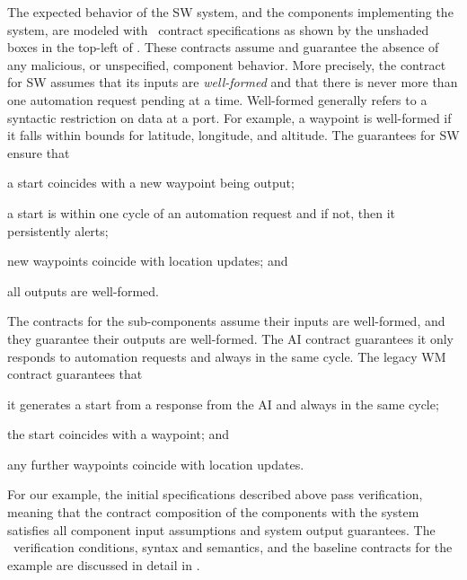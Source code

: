 
The expected behavior of the SW system, and the components
implementing the system, are modeled with \agr\ contract
specifications as shown by the unshaded boxes in the top-left of .
These contracts assume and guarantee the absence
of any malicious, or unspecified, component behavior.  More precisely,
the contract for SW assumes that its inputs are \emph{well-formed} and that
there is never more than one automation request pending at a time.
Well-formed generally refers to a syntactic restriction on
data at a port. For example, a waypoint is well-formed if it falls
within bounds for latitude, longitude, and altitude.  The guarantees
for SW ensure that
\begin{compactitem}
\item a start coincides with a new waypoint being output;
\item a start is within one cycle of an automation request and if not, then it persistently alerts;
\item new waypoints coincide with location updates; and
\item all outputs are well-formed.
\end{compactitem}

The contracts for the sub-components assume their inputs are
well-formed, and they guarantee their outputs are well-formed.  The AI
contract guarantees it only responds to automation requests and always
in the same cycle.  The legacy WM contract guarantees that
\begin{compactitem}
  \item it generates a start from a response from the AI and always in the same cycle;
  \item the start coincides with a waypoint; and
  \item any further waypoints coincide with location updates.
\end{compactitem}

For our example, the initial specifications described above pass verification, meaning that the
contract composition of the components with the system satisfies all
component input assumptions and system output guarantees.
The \agr\ verification conditions, syntax and semantics, and the baseline contracts for the example are discussed in detail in . 

